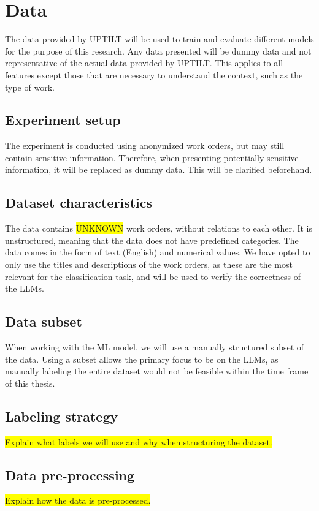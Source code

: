 \section{Data}

The data provided by UPTILT will be used to train and evaluate different models
for the purpose of this research. Any data presented will be dummy data and not representative
of the actual data provided by UPTILT. This applies to all features except those
that are necessary to understand the context, such as the type of work.

\subsection{Experiment setup}

The experiment is conducted using anonymized work orders, but may still contain sensitive
information. Therefore, when presenting potentially sensitive information, it
will be replaced as dummy data. This will be clarified beforehand.

\subsection{Dataset characteristics}

The data contains \colorbox{yellow}{UNKNOWN} work orders, without relations to each
other. It is unstructured, meaning that the data does not have predefined categories.
The data comes in the form of text (English) and numerical values. We have opted to
only use the titles and descriptions of the work orders, as these are the most
relevant for the classification task, and will be used to verify the correctness
of the LLMs.

\subsection{Data subset}

When working with the ML model, we will use a manually structured subset of the data.
Using a subset allows the primary focus to be on the LLMs, as manually labeling the
entire dataset would not be feasible within the time frame of this thesis.

\subsection{Labeling strategy}

\colorbox{yellow}{Explain what labels we will use and why when structuring the
dataset.}

\subsection{Data pre-processing}

\colorbox{yellow}{Explain how the data is pre-processed.}

